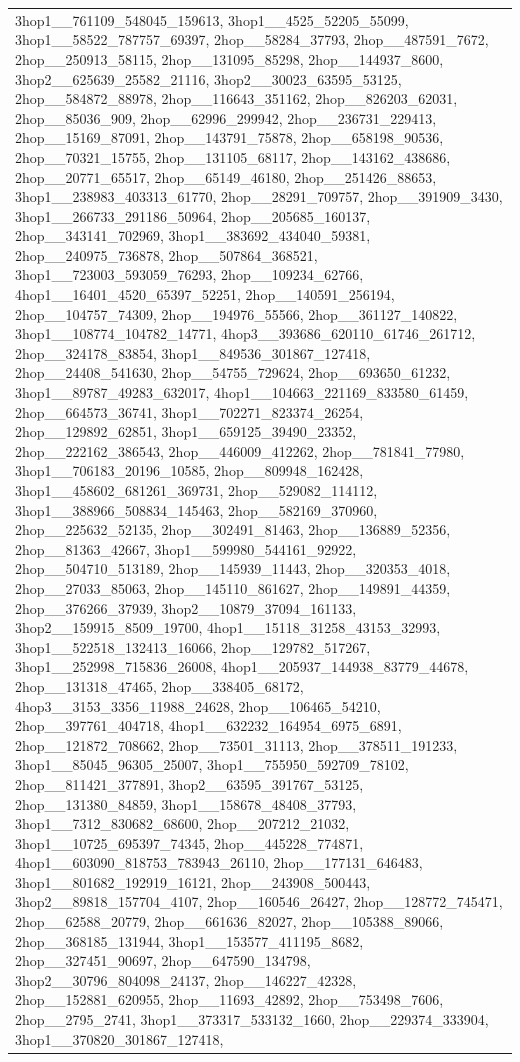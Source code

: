 \documentclass{article} %
\begin{document}
\begin{table}[h!]
\begin{tabular}{|p{12cm}|}
3hop1\_\_761109\_548045\_159613, 3hop1\_\_4525\_52205\_55099, 3hop1\_\_58522\_787757\_69397, 2hop\_\_58284\_37793, 2hop\_\_487591\_7672, 2hop\_\_250913\_58115, 2hop\_\_131095\_85298, 2hop\_\_144937\_8600, 3hop2\_\_625639\_25582\_21116, 3hop2\_\_30023\_63595\_53125, 2hop\_\_584872\_88978, 2hop\_\_116643\_351162, 2hop\_\_826203\_62031, 2hop\_\_85036\_909, 2hop\_\_62996\_299942, 2hop\_\_236731\_229413, 2hop\_\_15169\_87091, 2hop\_\_143791\_75878, 2hop\_\_658198\_90536, 2hop\_\_70321\_15755, 2hop\_\_131105\_68117, 2hop\_\_143162\_438686, 2hop\_\_20771\_65517, 2hop\_\_65149\_46180, 2hop\_\_251426\_88653, 3hop1\_\_238983\_403313\_61770, 2hop\_\_28291\_709757, 2hop\_\_391909\_3430, 3hop1\_\_266733\_291186\_50964, 2hop\_\_205685\_160137, 2hop\_\_343141\_702969, 3hop1\_\_383692\_434040\_59381, 2hop\_\_240975\_736878, 2hop\_\_507864\_368521, 3hop1\_\_723003\_593059\_76293, 2hop\_\_109234\_62766, 4hop1\_\_16401\_4520\_65397\_52251, 2hop\_\_140591\_256194, 2hop\_\_104757\_74309, 2hop\_\_194976\_55566, 2hop\_\_361127\_140822, 3hop1\_\_108774\_104782\_14771, 4hop3\_\_393686\_620110\_61746\_261712, 2hop\_\_324178\_83854, 3hop1\_\_849536\_301867\_127418, 2hop\_\_24408\_541630, 2hop\_\_54755\_729624, 2hop\_\_693650\_61232, 3hop1\_\_89787\_49283\_632017, 4hop1\_\_104663\_221169\_833580\_61459, 2hop\_\_664573\_36741, 3hop1\_\_702271\_823374\_26254, 2hop\_\_129892\_62851, 3hop1\_\_659125\_39490\_23352, 2hop\_\_222162\_386543, 2hop\_\_446009\_412262, 2hop\_\_781841\_77980, 3hop1\_\_706183\_20196\_10585, 2hop\_\_809948\_162428, 3hop1\_\_458602\_681261\_369731, 2hop\_\_529082\_114112, 3hop1\_\_388966\_508834\_145463, 2hop\_\_582169\_370960, 2hop\_\_225632\_52135, 2hop\_\_302491\_81463, 2hop\_\_136889\_52356, 2hop\_\_81363\_42667, 3hop1\_\_599980\_544161\_92922, 2hop\_\_504710\_513189, 2hop\_\_145939\_11443, 2hop\_\_320353\_4018, 2hop\_\_27033\_85063, 2hop\_\_145110\_861627, 2hop\_\_149891\_44359, 2hop\_\_376266\_37939, 3hop2\_\_10879\_37094\_161133, 3hop2\_\_159915\_8509\_19700, 4hop1\_\_15118\_31258\_43153\_32993, 3hop1\_\_522518\_132413\_16066, 2hop\_\_129782\_517267, 3hop1\_\_252998\_715836\_26008, 4hop1\_\_205937\_144938\_83779\_44678, 2hop\_\_131318\_47465, 2hop\_\_338405\_68172, 4hop3\_\_3153\_3356\_11988\_24628, 2hop\_\_106465\_54210, 2hop\_\_397761\_404718, 4hop1\_\_632232\_164954\_6975\_6891, 2hop\_\_121872\_708662, 2hop\_\_73501\_31113, 2hop\_\_378511\_191233, 3hop1\_\_85045\_96305\_25007, 3hop1\_\_755950\_592709\_78102, 2hop\_\_811421\_377891, 3hop2\_\_63595\_391767\_53125, 2hop\_\_131380\_84859, 3hop1\_\_158678\_48408\_37793, 3hop1\_\_7312\_830682\_68600, 2hop\_\_207212\_21032, 3hop1\_\_10725\_695397\_74345, 2hop\_\_445228\_774871, 4hop1\_\_603090\_818753\_783943\_26110, 2hop\_\_177131\_646483, 3hop1\_\_801682\_192919\_16121, 2hop\_\_243908\_500443, 3hop2\_\_89818\_157704\_4107, 2hop\_\_160546\_26427, 2hop\_\_128772\_745471, 2hop\_\_62588\_20779, 2hop\_\_661636\_82027, 2hop\_\_105388\_89066, 2hop\_\_368185\_131944, 3hop1\_\_153577\_411195\_8682, 2hop\_\_327451\_90697, 2hop\_\_647590\_134798, 3hop2\_\_30796\_804098\_24137, 2hop\_\_146227\_42328, 2hop\_\_152881\_620955, 2hop\_\_11693\_42892, 2hop\_\_753498\_7606, 2hop\_\_2795\_2741, 3hop1\_\_373317\_533132\_1660, 2hop\_\_229374\_333904, 3hop1\_\_370820\_301867\_127418, 
\end{tabular}
\end{table}
\end{document}
